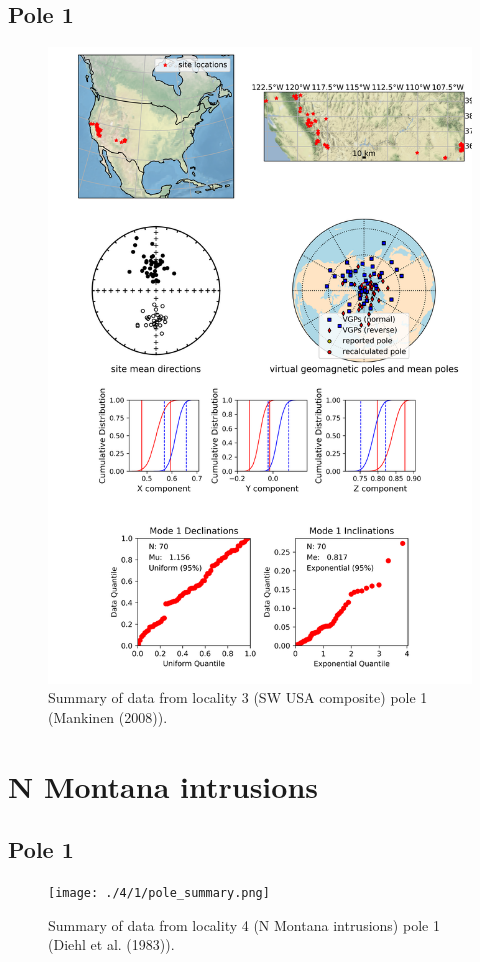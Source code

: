 \documentclass{article}
\begin{document}
\subsection{Pole 1}


\begin{figure}[H]
\centering
\includegraphics[width=5 in]{./3/1/pole_summary.png}
\caption{Summary of data from locality 3 (SW USA composite) pole 1 (Mankinen (2008)).}
\end{figure}

\section{N Montana intrusions}
\subsection{Pole 1}


\begin{figure}[H]
\centering
\texttt{[image: ./4/1/pole\_summary.png]}
\caption{Summary of data from locality 4 (N Montana intrusions) pole 1 (Diehl et al. (1983)).}
\end{figure}
\end{document}
